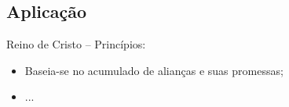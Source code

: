 \documentclass[12pt,aspectratio=169]{beamer}
\newcommand{\ORA}[1]{{\textcolor{TXred!50!TXyel}{#1}}}
\newcommand{\YEL}[1]{{\textcolor{TXyel}{#1}}}
\newcommand{\GRE}[1]{{\textcolor{TXgre}{#1}}}
\begin{document}
    \subsection{Aplicação}

    \begin{frame}{\YEL{Reino de Cristo} -- Princípios:}
        \begin{itemize}
            \item<1-> Baseia-se no \YEL{acumulado} de \GRE{alianças} e suas \ORA{promessas};
            \item<1-> ...
        \end{itemize}
    \end{frame}

\end{document}
